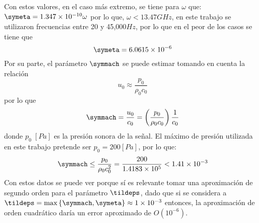 Con estos valores, en el caso más extremo, se tiene para $\omega$ que: $ \symeta = 1\text{.}347\times 10^{-10} \omega $ por lo que, $\omega < 13\text{.}47GHz$, en este trabajo se utilizaron frecuencias entre 20 y 45,000$Hz$, por lo que en el peor de los casos se tiene que \[ \symeta = 6\text{.}0615\times10^{-6}\]
Por su parte, el parámetro $\symmach$ se puede estimar tomando en cuenta la relación  \[ u_0 \approx \frac{p_0}{\rho_0 c_0} \]por lo que \[ \symmach = \frac{u_0}{c_0} = \left(\frac{p_0}{\rho_0 c_0} \right) \frac{1}{c_0}\] donde $p_0\; [Pa]$ es la presión sonora de la señal. El máximo de presión utilizada en este trabajo pretende ser $p_0 = 200 [Pa]$, por lo que:
\[  \symmach \leq \frac{p_0}{\rho_0 c^2_0} = \frac{200}{1\text{.}4183\times10^5} < 1.41\times10^{-3}\] %
Con estos datos se puede ver porque sí es relevante tomar una aproximación de segundo orden para el parámetro $\tildeps$, dado que si se considera a $\tildeps = \max\left\lbrace \symmach, \symeta\right\rbrace \approx 1\times10^{-3}$ entonces, la aproximación de orden cuadrático daría un error aproximado de $O\left(10^{-6}\right)$.
